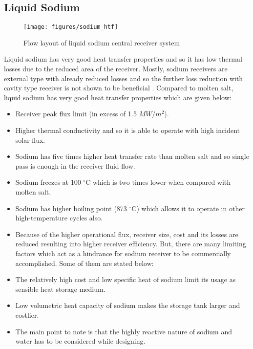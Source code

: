 \subsection{Liquid Sodium}
\begin{figure}[h!]
	\texttt{[image: figures/sodium\_htf]}
	\centering
	\caption{Flow layout of liquid sodium central receiver system \cite{Falcone.1986}}
\end{figure}
Liquid sodium has very good heat transfer properties and so it has low thermal losses due to the reduced area of the receiver. Mostly, sodium receivers are external type with already reduced losses and so the further loss reduction with cavity type receiver is not shown to be beneficial \cite{Falcone.1986}. Compared to molten salt, liquid sodium has very good heat transfer properties \cite{Falcone.1986} which are given below:
\begin{itemize}
\item Receiver peak flux limit (in excess of 1.5 $MW/m^2$).
\item Higher thermal conductivity and so it is able to operate with high incident solar flux.
\item Sodium has five times higher heat transfer rate than molten salt and so single pass is enough in the receiver fluid flow.
\item Sodium freezes at 100 $^{\circ}$C which is two times lower when compared with molten salt.
\item Sodium has higher boiling point (873 $^{\circ}$C) \cite{Nicholas.2012} which allows it to operate in other high-temperature cycles also.
\item Because of the higher operational flux, receiver size, cost and its losses are reduced resulting into higher receiver efficiency.
But, there are many limiting factors which act as a hindrance for sodium receiver to be commercially accomplished. Some of them \cite{Falcone.1986} are stated below:
\item The relatively high cost and low specific heat of sodium limit its usage as sensible heat storage medium.
\item Low volumetric heat capacity of sodium makes the storage tank larger and costlier.
\item The main point to note is that the highly reactive nature of sodium and water has to be considered while designing.
\end{itemize}
